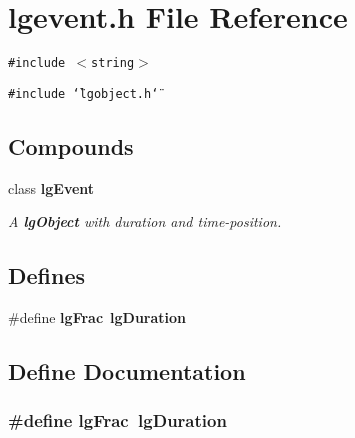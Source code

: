 \section{lgevent.h File Reference}
\label{lgevent_8h}
{\tt \#include $<$string$>$}\par
{\tt \#include \char`\"{}lgobject.h\char`\"{}}\par
\subsection*{Compounds}
\begin{CompactItemize}
\item 
class {\bf lg\-Event}
\begin{CompactList}\small\item\em A {\bf lg\-Object} with duration and time-position. \item\end{CompactList}\end{CompactItemize}
\subsection*{Defines}
\begin{CompactItemize}
\item 
\#define {\bf lg\-Frac}\ {\bf lg\-Duration}
\end{CompactItemize}


\subsection{Define Documentation}
\subsubsection{\setlength{\rightskip}{0pt plus 5cm}\#define lg\-Frac\ {\bf lg\-Duration}}\label{lgevent_8h_a0}



